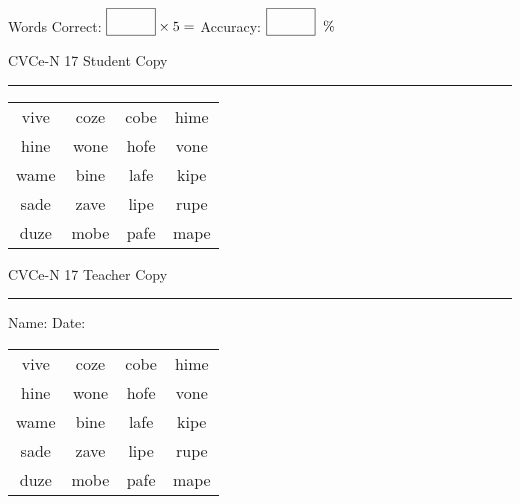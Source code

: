 \documentclass{memoir}
\begin{document}
\small

Words Correct: $\fbox{\phantom{\huge 100}} \times 5 = $ Accuracy: $\fbox{\phantom{\huge 100}}\;\; \%$ 

\vfill

\newpage


\footnotesize \noindent
CVCe-N 17 \hfill Student Copy
\smallskip
\hrule

\Large

\setlength{\tabcolsep}{14pt}
\def\arraystretch{2}

{\selectfont


\begin{vplace}[0.5]
\begin{center}
\begin{tabular}{cccc}
vive & coze & cobe & hime \\
hine & wone & hofe & vone \\
wame & bine & lafe & kipe \\
sade & zave & lipe & rupe \\
duze & mobe & pafe & mape \\
\end{tabular}
\end{center}
\end{vplace}

}

\newpage

\footnotesize \noindent
CVCe-N 17 \hfill Teacher Copy
\smallskip
\hrule

\small

\vfill

\noindent
Name: \underline{\hspace{1.75in}} \hfill Date: \underline{\hspace{1in}}

\Large

{\selectfont


\begin{vplace}[0.5]
\begin{center}
\begin{tabular}{cccc}
vive & coze & cobe & hime \\
hine & wone & hofe & vone \\
wame & bine & lafe & kipe \\
sade & zave & lipe & rupe \\
duze & mobe & pafe & mape \\
\end{tabular}
\end{center}
\end{vplace}



}
\end{document}
